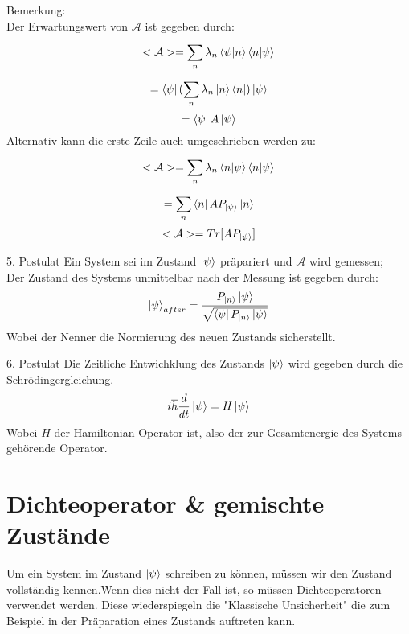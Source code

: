 \documentclass{report}
\begin{document}
Bemerkung:\\
Der Erwartungswert von $\mathcal{A}$ ist gegeben durch: \[
<\mathcal{A}> = \sum_{n}^{} \lambda_n \braket{\psi}{n}\braket{n}{\psi}\] \[ 
= \bra{\psi} (\sum_{n}^{} \lambda_n \ket{n}\bra{n}) \ket{\psi} \]\[
	= \bra{\psi} A \ket{\psi}
\] 
Alternativ kann die erste Zeile auch umgeschrieben werden zu: \[
<\mathcal{A}> = \sum_{n}^{} \lambda_n \braket{n}{\psi}\braket{n}{\psi}
\] \[
= \sum_{n}^{} \bra{n} A P_{\ket{\psi}} \ket{n}
\] \[
<\mathcal{A}> = Tr[AP_{\ket{\psi}}]
\]  
\begin{greenbox}{5. Postulat}
	Ein System sei im Zustand $\ket{\psi}$ präpariert und $\mathcal{A}$ wird gemessen;\\
	Der Zustand des Systems unmittelbar nach der Messung ist gegeben durch: \[
		\ket{\psi}_{after} = \frac{P_{\ket{n}}\ket{\psi}}{\sqrt{\bra{\psi} P_{\ket{n}} \ket{\psi}} }
	\] Wobei der Nenner die Normierung des neuen Zustands sicherstellt.
\end{greenbox}
\begin{greenbox}{6. Postulat}
	Die Zeitliche Entwichklung des Zustands $\ket{\psi}$ wird gegeben durch die Schrödingergleichung. \[
		i \overline{h} \frac{d}{dt} \ket{\psi} = H\ket{\psi}
	\] Wobei $H$ der Hamiltonian Operator ist, also der zur Gesamtenergie des Systems gehörende Operator.
\end{greenbox}
\section{Dichteoperator \& gemischte Zustände}
Um ein System im Zustand $\ket{\psi}$ schreiben zu können, müssen wir den Zustand vollständig kennen.Wenn dies nicht der Fall ist, so müssen Dichteoperatoren verwendet werden. Diese wiederspiegeln die "Klassische Unsicherheit" die zum Beispiel in der Präparation eines Zustands auftreten kann.
\end{document}
